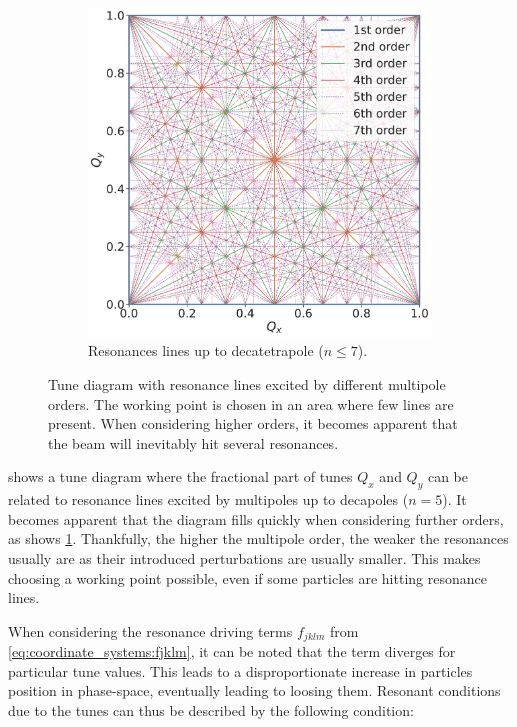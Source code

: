 \begin{figure}[!htb]
\begin{subfigure}[b]{0.6\textwidth}
        \includegraphics[width=\textwidth]{images/resonance_diagram_n7.pdf}
        \caption{Resonances lines up to decatetrapole ($n \leq 7$).}
        \label{fig:resonances:diagram_n7}
    \end{subfigure}
    \caption{Tune diagram with resonance lines excited by different multipole orders. The working
    point is chosen in an area where few lines are present. When considering higher orders, it
    becomes apparent that the beam will inevitably hit several resonances.}
    \label{fig:resonances:diagrams}
\end{figure}

 shows a tune diagram where the fractional part of tunes $Q_x$ and
$Q_y$ can be related to resonance lines excited by multipoles up to decapoles ($n=5$).
It becomes apparent that the diagram fills quickly when considering further orders, as shows
\cref{fig:resonances:diagram_n7}. Thankfully, the higher the multipole order, the weaker the
resonances usually are as their introduced perturbations are usually smaller. This makes choosing a
working point possible, even if some particles are hitting resonance lines.


When considering the resonance driving terms $f_{jklm}$ from \cref{eq:coordinate_systems:fjklm}, it
can be noted that the term diverges for particular tune values. This leads to a disproportionate
increase in particles position in phase-space, eventually leading to loosing them.
Resonant conditions due to the tunes can thus be described by the following condition:

